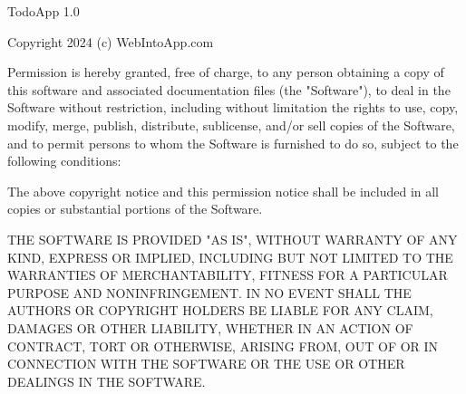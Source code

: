 
TodoApp 1.0

Copyright 2024 (c) WebIntoApp.com

Permission is hereby granted, free of charge, to any person obtaining a copy of
this software and associated documentation files (the "Software"), to deal in the
Software without restriction, including without limitation the rights to use,
copy, modify, merge, publish, distribute, sublicense, and/or sell copies of the
Software, and to permit persons to whom the Software is furnished to do so,
subject to the following conditions:

The above copyright notice and this permission notice shall be included in
all copies or substantial portions of the Software.

THE SOFTWARE IS PROVIDED "AS IS", WITHOUT WARRANTY OF ANY KIND, EXPRESS OR
IMPLIED, INCLUDING BUT NOT LIMITED TO THE WARRANTIES OF MERCHANTABILITY,
FITNESS FOR A PARTICULAR PURPOSE AND NONINFRINGEMENT. IN NO EVENT SHALL THE
AUTHORS OR COPYRIGHT HOLDERS BE LIABLE FOR ANY CLAIM, DAMAGES OR OTHER
LIABILITY, WHETHER IN AN ACTION OF CONTRACT, TORT OR OTHERWISE, ARISING FROM,
OUT OF OR IN CONNECTION WITH THE SOFTWARE OR THE USE OR OTHER DEALINGS IN THE
SOFTWARE.